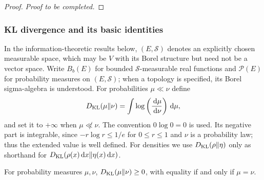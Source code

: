 \documentclass[12pt,a4paper,oneside]{book}
\begin{document}
\begin{proof}
\noindent\textit{Proof to be completed.}
\end{proof}


\subsubsection{KL divergence and its basic identities}
In the information-theoretic results below, $(E,\mathcal S)$ denotes an explicitly chosen measurable space, which may be
$V$ with its Borel structure but need not be a vector space. Write $B_b(E)$ for bounded $\mathcal S$-measurable real functions 
and $\mathcal P(E)$ for probability measures on $(E,\mathcal S)$; when a topology is specified, its Borel sigma-algebra 
is understood. For probabilities $\mu\ll\nu$ define
\begin{equation*}
    D_{\mathrm{KL}}(\mu\Vert\nu)=\int\log\left(\frac{\,\mathrm{d}\mu}{\,\mathrm{d}\nu}\right)\,\mathrm{d}\mu,
\end{equation*}
and set it to $+\infty$ when $\mu\not\ll\nu$. The convention $0\log0=0$ is used. Its negative part is integrable, since
$-r\log r\le1/e$ for $0\le r\le1$ and $\nu$ is a probability law; thus the extended value is well defined. For densities 
we use $D_{\mathrm{KL}}(\rho\Vert\eta)$ only as shorthand for $D_{\mathrm{KL}}(\rho(x)\,\mathrm{d} x\Vert\eta(x)\,\mathrm{d} x)$.

\begin{theorem}
\label{thm:kl}
\label{src:p11q1}
For probability measures $\mu,\nu$, $D_{\mathrm{KL}}(\mu\Vert\nu)\geq0$, with equality if and only if $\mu=\nu$.
\end{theorem}
\end{document}
